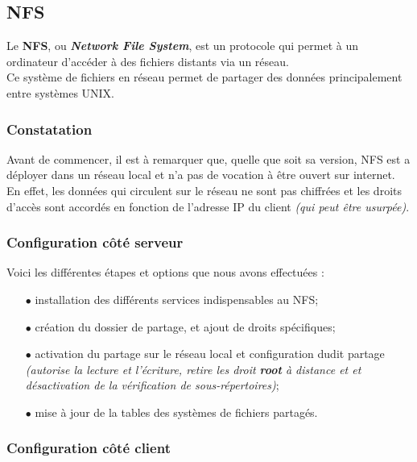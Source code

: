\subsection{NFS}
\label{subsec:nfs}

Le \textbf{NFS}, ou \textit{\textbf{Network File System}}, est un protocole qui
permet à un ordinateur d'accéder à des fichiers distants via un réseau. \\
Ce système de fichiers en réseau permet de partager des données principalement
entre systèmes UNIX.


\subsubsection{Constatation}
\label{subsubsec:constatation}

Avant de commencer, il est à remarquer que, quelle que soit sa version, NFS est
a déployer dans un réseau local et n'a pas de vocation à être ouvert sur internet. \\
En effet, les données qui circulent sur le réseau ne sont pas chiffrées et les
droits d'accès sont accordés en fonction de l'adresse IP du client
\textit{(qui peut être usurpée)}.


\subsubsection{Configuration côté serveur}
\label{subsubsec:config-serveur}

Voici les différentes étapes et options que nous avons effectuées :
\begin{itemize}

    \item[$\bullet$] installation des différents services indispensables au NFS;
    \item[$\bullet$] création du dossier de partage, et ajout de droits
    spécifiques;
    \item[$\bullet$] activation du partage sur le réseau local et configuration
    dudit partage \textit{(autorise la lecture et l'écriture, retire les droit
    \textbf{root} à distance et et désactivation de la vérification de sous-répertoires)};
    \item[$\bullet$] mise à jour de la tables des systèmes de fichiers partagés.

\end{itemize}


\subsubsection{Configuration côté client}
\label{subsubsec:config-client}

